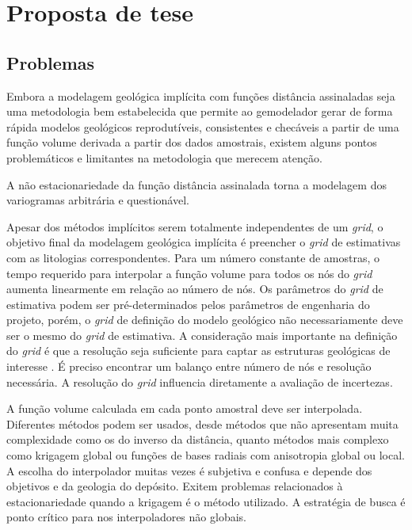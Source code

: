 \chapter{Proposta de tese}

\section{Problemas}\label{problemas}

Embora a modelagem geológica implícita com funções distância assinaladas seja uma metodologia bem estabelecida que permite ao gemodelador gerar de forma rápida modelos geológicos reprodutíveis, consistentes e checáveis a partir de uma função volume derivada a partir dos dados amostrais, existem alguns pontos problemáticos e limitantes na metodologia que merecem atenção.

A não estacionariedade da função distância assinalada torna a modelagem dos variogramas arbitrária e questionável.

Apesar dos métodos implícitos serem totalmente independentes de um \textit{grid}, o objetivo final da modelagem geológica implícita é preencher o \textit{grid} de estimativas com as litologias correspondentes. Para um número constante de amostras, o tempo requerido para interpolar a função volume para todos os nós do \textit{grid} aumenta linearmente em relação ao número de nós. Os parâmetros do \textit{grid} de estimativa podem ser pré-determinados pelos parâmetros de engenharia do projeto, porém, o \textit{grid} de definição do modelo geológico não necessariamente deve ser o mesmo do \textit{grid} de estimativa. A consideração mais importante na definição do \textit{grid} é que a resolução seja suficiente para captar as estruturas geológicas de interesse \cite{martin2017implicitmodeling}. É preciso encontrar um balanço entre número de nós e resolução necessária. A resolução do \textit{grid} influencia diretamente a avaliação de incertezas.

A função volume calculada em cada ponto amostral deve ser interpolada. Diferentes métodos podem ser usados, desde métodos que não apresentam muita complexidade como os do inverso da distância, quanto métodos mais complexo como krigagem global ou funções de bases radiais com anisotropia global ou local. A escolha do interpolador muitas vezes é subjetiva e confusa e depende dos objetivos e da geologia do depósito. Exitem problemas relacionados à estacionariedade quando a krigagem é o método utilizado. A estratégia de busca é ponto crítico para nos interpoladores não globais.

